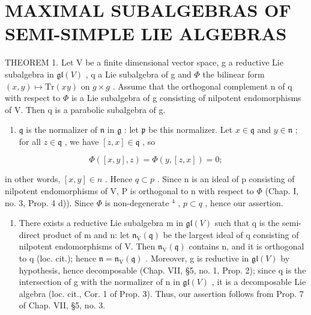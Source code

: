 \section{MAXIMAL SUBALGEBRAS OF SEMI-SIMPLE LIE ALGEBRAS}

THEOREM 1. Let V be a finite dimensional vector space, g a reductive Lie subalgebra in \(\mathfrak{gl}(V)\) , q a Lie subalgebra of g and \(\Phi\) the bilinear form \((x,y)\mapsto\mathrm{Tr}(xy)\) on \(g\times g\) . Assume that the orthogonal complement n of q with respect to \(\Phi\) is a Lie subalgebra of g consisting of nilpotent endomorphisms of V. Then q is a parabolic subalgebra of g.

\begin{enumerate}
\def\labelenumi{\alph{enumi})}
\tightlist
\item
  \(\mathfrak{q}\) is the normalizer of \(\mathfrak{n}\) in \(\mathfrak{g}\) : let \(\mathfrak{p}\) be this normalizer. Let \(x \in \mathfrak{q}\) and \(y \in \mathfrak{n}\) ; for all \(z \in \mathfrak{q}\) , we have \([z, x] \in \mathfrak{q}\) , so
\end{enumerate}

\[
\Phi ([ x, y ], z) = \Phi (y, [ z, x ]) = 0;
\]

in other words, \([x,y] \in n\) . Hence \(q \subset p\) . Since n is an ideal of p consisting of nilpotent endomorphisms of V, P is orthogonal to n with respect to \(\varPhi\) (Chap. I, no. 3, Prop. 4 d)). Since \(\varPhi\) is non-degenerate \(^{4}\) , \(p \subset q\) , hence our assertion.

\begin{enumerate}
\def\labelenumi{\alph{enumi})}
\setcounter{enumi}{1}
\tightlist
\item
  There exists a reductive Lie subalgebra m in \(\mathfrak{gl}(V)\) such that q is the semi-direct product of m and n: let \(\mathfrak{n}_{\mathrm{V}}(\mathfrak{q})\) be the largest ideal of q consisting of nilpotent endomorphisms of V. Then \(\mathfrak{n}_{\mathrm{V}}(\mathfrak{q})\) contains n, and it is orthogonal to q (loc. cit.); hence \(\mathfrak{n} = \mathfrak{n}_{\mathrm{V}}(\mathfrak{q})\) . Moreover, g is reductive in \(\mathfrak{gl}(V)\) by hypothesis, hence decomposable (Chap. VII, §5, no. 1, Prop. 2); since q is the intersection of g with the normalizer of n in \(\mathfrak{gl}(V)\) , it is a decomposable Lie algebra (loc. cit., Cor. 1 of Prop. 3). Thus, our assertion follows from Prop. 7 of Chap. VII, §5, no. 3.
\end{enumerate}

